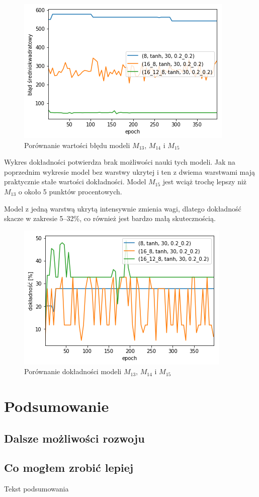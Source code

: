 \documentclass{report}
\begin{document}
    \begin{figure}[htp]
        \centering
        \includegraphics[scale=0.8]{./img/arch-error-tanh.png}
        \caption{Porównanie wartości błędu modeli $M_{13}$, $M_{14}$ i $M_{15}$}
    \end{figure}

    Wykres dokładności potwierdza brak możliwości nauki tych modeli.
    Jak na poprzednim wykresie model bez warstwy ukrytej i ten z dwiema warstwami mają praktycznie stałe wartości dokładności.
    Model $M_{15}$ jest wciąż trochę lepszy niż $M_{13}$ o około 5 punktów procentowych.

    Model z jedną warstwą ukrytą intensywnie zmienia wagi, dlatego dokładność skacze w zakresie 5--32\%, co również jest bardzo małą skutecznością.

    \begin{figure}[htp]
        \centering
        \includegraphics[scale=0.8]{././img/arch-accuracy-tanh.png}
        \caption{Porównanie dokładności modeli $M_{13}$, $M_{14}$ i $M_{15}$}
    \end{figure}

    \chapter{Podsumowanie}\label{ch:podsumowanie}

    \section{Dalsze możliwości rozwoju}\label{sec:dalszeMozliwosciRozwoju}

    \section{Co mogłem zrobić lepiej}\label{sec:coMoglemZrobicLepiej}

    Tekst podsumowania

    
    

    \listoffigures
    \listoftables
\end{document}
